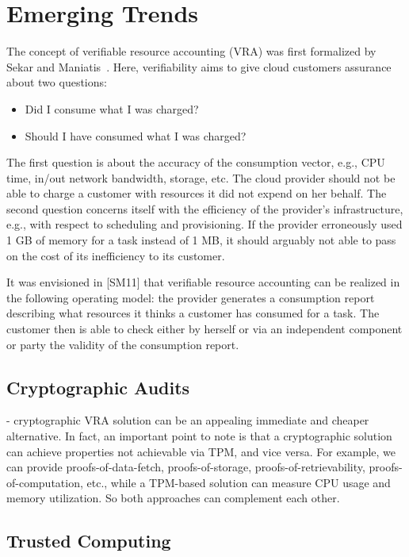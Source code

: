 \section{Emerging Trends} \label{sect:new-trends}

The concept of verifiable resource accounting (VRA) was first formalized by Sekar and Maniatis~\cite{SM11}.
Here, verifiability aims to give cloud customers assurance about two questions:
\begin{itemize}
 \item Did I consume what I was charged?
 \item Should I have consumed what I was charged?
\end{itemize}
The first question is about the accuracy of the consumption vector, e.g., CPU time, in/out network bandwidth, storage, etc. The cloud provider should not be able to charge a customer with resources it did not expend on her behalf. The second question concerns itself with the efficiency of the provider's infrastructure, e.g., with respect to scheduling and provisioning. If the provider erroneously used 1 GB of memory for a task instead of 1 MB, it should arguably not able to pass on the cost of its inefficiency to its customer.

It was envisioned in [SM11] that verifiable resource accounting can be realized in the following operating model: the provider generates a consumption report describing what resources it thinks a customer has consumed for a task. The customer then is able to check either by herself or via an independent component or party the validity of the consumption report. 

\subsection{Cryptographic Audits} \label{sect:crypto-audits}


- cryptographic VRA solution can be an appealing immediate and cheaper alternative. In fact, an important point to note is that a cryptographic solution can achieve properties not achievable via TPM, and vice versa. For example, we can provide proofs-of-data-fetch, proofs-of-storage, proofs-of-retrievability, proofs-of-computation, etc., while a TPM-based solution can measure CPU usage and memory utilization. So both approaches can complement each other.

\subsection{Trusted Computing} \label{sect:trusted-computing}

